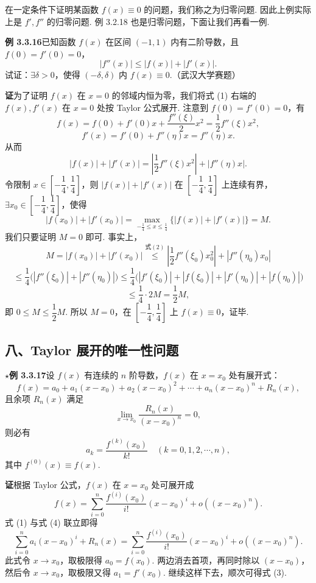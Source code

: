 \documentclass[UTF8, 12pt, fontset=fandol, oneside]{ctexart}
\begin{document}
在一定条件下证明某函数 $f(x)\equiv0$ 的问题，我们称之为归零问题. 因此上例实际上是 $f',f''$ 的归零问题. 例 3.2.18 也是归零问题，下面让我们再看一例.

\noindent\textbf{例 3.3.16}\quad 已知函数 $f(x)$ 在区间 $(-1,1)$ 内有二阶导数，且 $f(0)=f'(0)=0$，
\[
  |f''(x)|\le |f(x)|+|f'(x)|. \tag{1}
\]
试证：$\exists\delta>0$，使得 $(-\delta,\delta)$ 内 $f(x)\equiv0$.（武汉大学赛题）

\noindent\textbf{证}\quad 为了证明 $f(x)$ 在 $x=0$ 的邻域内恒为零，我们将式 (1) 右端的 $f(x),f'(x)$ 在 $x=0$ 处按 Taylor 公式展开. 注意到 $f(0)=f'(0)=0$，有
\[
  f(x)=f(0)+f'(0)x+\frac{f''(\xi)}2x^2=\frac12f''(\xi)x^2,
\]
\[
  f'(x)=f'(0)+f''(\eta)x=f''(\eta)x.
\]
从而
\[
  |f(x)|+|f'(x)|=\left|\frac12f''(\xi)x^2\right|+|f''(\eta)x|. \tag{2}
\]
令限制 $x\in\left[-\dfrac14,\dfrac14\right]$，则 $|f(x)|+|f'(x)|$ 在 $\left[-\dfrac14,\dfrac14\right]$ 上连续有界，$\exists x_0\in\left[-\dfrac14,\dfrac14\right]$，使得
\[
  |f(x_0)|+|f'(x_0)|=\max_{-\frac14\le x\le\frac14}\{|f(x)|+|f'(x)|\}=M.
\]
我们只要证明 $M=0$ 即可. 事实上，
\[
  M=|f(x_0)|+|f'(x_0)|
  \overset{\text{式}(2)}{\le}
  \left|\frac12f''(\xi_0)x_0^2\right|+|f''(\eta_0)x_0|
\]
\[
  \le \frac14\bigl(|f''(\xi_0)|+|f''(\eta_0)|\bigr)
  \le \frac14\bigl(|f'(\xi_0)|+|f(\xi_0)|+|f'(\eta_0)|+|f(\eta_0)|\bigr)
\]
\[
  \le \frac14\cdot2M=\frac12M,
\]
即 $0\le M\le\dfrac12M$. 所以 $M=0$，在 $\left[-\dfrac14,\dfrac14\right]$ 上 $f(x)\equiv0$，证毕.

\subsection*{八、Taylor 展开的唯一性问题}

\noindent\textbf{$\star$例 3.3.17}\quad 设 $f(x)$ 有连续的 $n$ 阶导数，$f(x)$ 在 $x=x_0$ 处有展开式：
\[
  f(x)=a_0+a_1(x-x_0)+a_2(x-x_0)^2+\cdots+a_n(x-x_0)^n+R_n(x), \tag{1}
\]
且余项 $R_n(x)$ 满足
\[
  \lim_{x\to x_0}\frac{R_n(x)}{(x-x_0)^n}=0, \tag{2}
\]
则必有
\[
  a_k=\frac{f^{(k)}(x_0)}{k!}\quad(k=0,1,2,\cdots,n), \tag{3}
\]
其中 $f^{(0)}(x)\equiv f(x)$.

\noindent\textbf{证}\quad 根据 Taylor 公式，$f(x)$ 在 $x=x_0$ 处可展开成
\[
  f(x)=\sum_{i=0}^n\frac{f^{(i)}(x_0)}{i!}(x-x_0)^i+o((x-x_0)^n). \tag{4}
\]
式 (1) 与式 (4) 联立即得
\[
  \sum_{i=0}^n a_i(x-x_0)^i+R_n(x)
  =\sum_{i=0}^n\frac{f^{(i)}(x_0)}{i!}(x-x_0)^i+o((x-x_0)^n).
\]
此式令 $x\to x_0$，取极限得 $a_0=f(x_0)$. 两边消去首项，再同时除以 $(x-x_0)$，然后令 $x\to x_0$，取极限又得 $a_1=f'(x_0)$. 继续这样下去，顺次可得式 (3).
\end{document}
